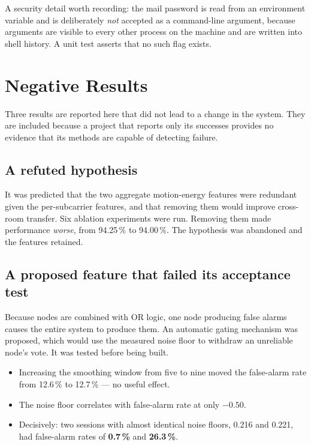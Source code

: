 \documentclass[11pt,a4paper]{article}
\begin{document}
\noindent
A security detail worth recording: the mail password is read from an
environment variable and is deliberately \emph{not} accepted as a command-line
argument, because arguments are visible to every other process on the machine
and are written into shell history. A unit test asserts that no such flag
exists.

\section{Negative Results}
\label{sec:negative}

Three results are reported here that did not lead to a change in the system.
They are included because a project that reports only its successes provides no
evidence that its methods are capable of detecting failure.

\subsection{A refuted hypothesis}

It was predicted that the two aggregate motion-energy features were redundant
given the per-subcarrier features, and that removing them would improve
cross-room transfer. Six ablation experiments were run. Removing them made
performance \emph{worse}, from 94.25\,\% to 94.00\,\%. The hypothesis was
abandoned and the features retained.

\subsection{A proposed feature that failed its acceptance test}

Because nodes are combined with OR logic, one node producing false alarms
causes the entire system to produce them. An automatic gating mechanism was
proposed, which would use the measured noise floor to withdraw an unreliable
node's vote. It was tested before being built.

\begin{itemize}[leftmargin=1.4em, itemsep=2pt]
  \item Increasing the smoothing window from five to nine moved the false-alarm
        rate from 12.6\,\% to 12.7\,\% --- no useful effect.
  \item The noise floor correlates with false-alarm rate at only $-0.50$.
  \item Decisively: two sessions with almost identical noise floors, 0.216 and
        0.221, had false-alarm rates of \textbf{0.7\,\%} and \textbf{26.3\,\%}.
\end{itemize}
\end{document}
